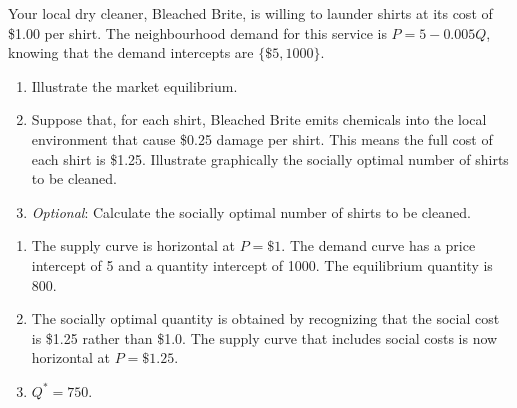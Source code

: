\begin{enumialphparenastyle}
\begin{econex}\label{ex:ch5ex7}
Your local dry cleaner, Bleached Brite, is willing to launder shirts at its cost of \$1.00 per shirt. The neighbourhood demand for this service is $P=5-0.005Q$, knowing that the demand intercepts are $\{\$5,1000\}$.
\begin{enumerate}
\item	Illustrate the market equilibrium.
\item	Suppose that, for each shirt, Bleached Brite emits chemicals into the local environment that cause \$0.25 damage per shirt. This means the full cost of each shirt is \$1.25. Illustrate graphically the socially optimal number of shirts to be cleaned.
\item	\textit{Optional}: Calculate the socially optimal number of shirts to be cleaned.
\end{enumerate}
\begin{econsolution}
\begin{enumerate}
\item	The supply curve is horizontal at $P=\$1$. The demand curve has	a price intercept of 5 and a quantity intercept of 1000. The equilibrium quantity is 800.
\item	The socially optimal quantity is obtained by recognizing that the social cost is \$1.25 rather than \$1.0. The supply curve that includes social costs is now horizontal at $P=\$1.25$.
\item	$Q^{*}=750$.
\end{enumerate}
\end{econsolution}
\end{econex}


\end{enumialphparenastyle}
